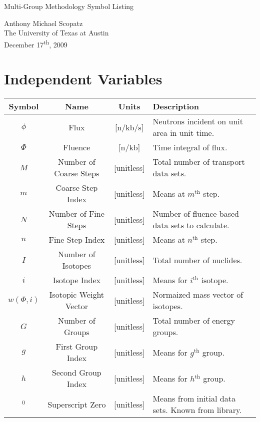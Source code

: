 \documentclass[a4paper, 12pt]{article}
\newcommand{\superscript}[1]{\ensuremath{^{\textrm{#1}}}}
\begin{document}
\begin{center}

Multi-Group Methodology Symbol Listing
\vspace{10mm}

Anthony Michael Scopatz\\
The University of Texas at Austin\\
December 17\textsuperscript{th}, 2009
\end{center}
\vspace{5mm}

\section{Independent Variables}

\noindent
\begin{center}
\begin{tabular}{|c|c|c|m{10em}|}
\hline
\textbf{Symbol}&\textbf{Name}&\textbf{Units}&\textbf{Description}\\
\hline
$\phi$& Flux & [n/kb/s] & Neutrons incident on unit area in unit time.\\
\hline
$\Phi$& Fluence & [n/kb] & Time integral of flux.\\
\hline
$M$& Number of Coarse Steps & [unitless] & Total number of transport data sets.\\
\hline
$m$& Coarse Step Index & [unitless] & Means at $m$\superscript{th} step.\\
\hline
$N$& Number of Fine Steps & [unitless] & Number of fluence-based data sets to calculate.\\
\hline
$n$& Fine Step Index & [unitless] & Means at $n$\superscript{th} step.\\
\hline
$I$& Number of Isotopes & [unitless] & Total number of nuclides.\\
\hline
$i$& Isotope Index & [unitless] & Means for $i$\superscript{th} isotope.\\
\hline
$w(\Phi, i)$& Isotopic Weight Vector & [unitless] & Normaized mass vector of isotopes.\\
\hline
$G$& Number of Groups & [unitless] & Total number of energy groups.\\
\hline
$g$& First Group Index & [unitless] & Means for $g$\superscript{th} group.\\
\hline
$h$& Second Group Index & [unitless] & Means for $h$\superscript{th} group.\\
\hline
$^0$& Superscript Zero & [unitless] & Means from initial data sets. Known from library.\\
\hline
\end{tabular}
\end{center}
\end{document}
